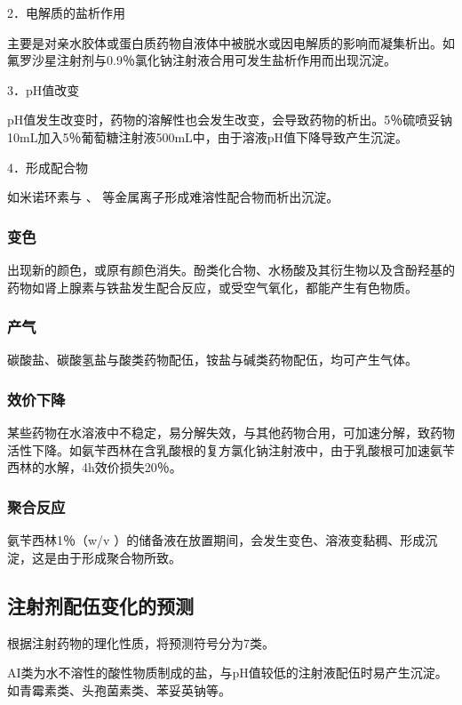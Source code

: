 2．电解质的盐析作用

主要是对亲水胶体或蛋白质药物自液体中被脱水或因电解质的影响而凝集析出。如氟罗沙星注射剂与0.9％氯化钠注射液合用可发生盐析作用而出现沉淀。

3．pH值改变

pH值发生改变时，药物的溶解性也会发生改变，会导致药物的析出。5％硫喷妥钠10mL加入5％葡萄糖注射液500mL中，由于溶液pH值下降导致产生沉淀。

4．形成配合物

如米诺环素与 、 等金属离子形成难溶性配合物而析出沉淀。

\subsubsection{变色}

出现新的颜色，或原有颜色消失。酚类化合物、水杨酸及其衍生物以及含酚羟基的药物如肾上腺素与铁盐发生配合反应，或受空气氧化，都能产生有色物质。

\subsubsection{产气}

碳酸盐、碳酸氢盐与酸类药物配伍，铵盐与碱类药物配伍，均可产生气体。

\subsubsection{效价下降}

某些药物在水溶液中不稳定，易分解失效，与其他药物合用，可加速分解，致药物活性下降。如氨苄西林在含乳酸根的复方氯化钠注射液中，由于乳酸根可加速氨苄西林的水解，4h效价损失20％。

\subsubsection{聚合反应}

氨苄西林1％（{w/v}
）的储备液在放置期间，会发生变色、溶液变黏稠、形成沉淀，这是由于形成聚合物所致。

\subsection{注射剂配伍变化的预测}

根据注射药物的理化性质，将预测符号分为7类。

AI类为水不溶性的酸性物质制成的盐，与pH值较低的注射液配伍时易产生沉淀。如青霉素类、头孢菌素类、苯妥英钠等。

